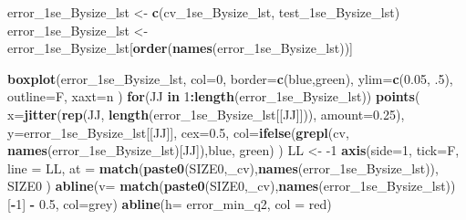 \documentclass[
]{book}
\newenvironment{Shaded}{\begin{snugshade}}{\end{snugshade}}
\newcommand{\ControlFlowTok}[1]{\textcolor[rgb]{0.13,0.29,0.53}{\textbf{#1}}}
\newcommand{\DataTypeTok}[1]{\textcolor[rgb]{0.13,0.29,0.53}{#1}}
\newcommand{\DecValTok}[1]{\textcolor[rgb]{0.00,0.00,0.81}{#1}}
\newcommand{\FloatTok}[1]{\textcolor[rgb]{0.00,0.00,0.81}{#1}}
\newcommand{\KeywordTok}[1]{\textcolor[rgb]{0.13,0.29,0.53}{\textbf{#1}}}
\newcommand{\NormalTok}[1]{#1}
\newcommand{\OperatorTok}[1]{\textcolor[rgb]{0.81,0.36,0.00}{\textbf{#1}}}
\newcommand{\StringTok}[1]{\textcolor[rgb]{0.31,0.60,0.02}{#1}}
\begin{document}
\begin{Shaded}
\begin{Highlighting}[]
\NormalTok{error\_1se\_Bysize\_lst <{-}}\StringTok{ }\KeywordTok{c}\NormalTok{(cv\_1se\_Bysize\_lst, test\_1se\_Bysize\_lst)}
\NormalTok{error\_1se\_Bysize\_lst <{-}}\StringTok{ }\NormalTok{error\_1se\_Bysize\_lst[}\KeywordTok{order}\NormalTok{(}\KeywordTok{names}\NormalTok{(error\_1se\_Bysize\_lst))]}

\KeywordTok{boxplot}\NormalTok{(error\_1se\_Bysize\_lst,}
  \DataTypeTok{col=}\DecValTok{0}\NormalTok{,}
  \DataTypeTok{border=}\KeywordTok{c}\NormalTok{(}\StringTok{\textquotesingle{}blue\textquotesingle{}}\NormalTok{,}\StringTok{\textquotesingle{}green\textquotesingle{}}\NormalTok{),}
  \DataTypeTok{ylim=}\KeywordTok{c}\NormalTok{(}\FloatTok{0.05}\NormalTok{, }\FloatTok{.5}\NormalTok{),}
  \DataTypeTok{outline=}\NormalTok{F,}
  \DataTypeTok{xaxt=}\StringTok{\textquotesingle{}n\textquotesingle{}}
\NormalTok{)}
\ControlFlowTok{for}\NormalTok{(JJ }\ControlFlowTok{in} \DecValTok{1}\OperatorTok{:}\KeywordTok{length}\NormalTok{(error\_1se\_Bysize\_lst))}
\KeywordTok{points}\NormalTok{(}
   \DataTypeTok{x=}\KeywordTok{jitter}\NormalTok{(}\KeywordTok{rep}\NormalTok{(JJ, }\KeywordTok{length}\NormalTok{(error\_1se\_Bysize\_lst[[JJ]])), }\DataTypeTok{amount=}\FloatTok{0.25}\NormalTok{), }
   \DataTypeTok{y=}\NormalTok{error\_1se\_Bysize\_lst[[JJ]], }\DataTypeTok{cex=}\FloatTok{0.5}\NormalTok{,}
   \DataTypeTok{col=}\KeywordTok{ifelse}\NormalTok{(}\KeywordTok{grepl}\NormalTok{(}\StringTok{\textquotesingle{}cv\textquotesingle{}}\NormalTok{, }\KeywordTok{names}\NormalTok{(error\_1se\_Bysize\_lst)[JJ]),}\StringTok{\textquotesingle{}blue\textquotesingle{}}\NormalTok{, }\StringTok{\textquotesingle{}green\textquotesingle{}}\NormalTok{)}
\NormalTok{)}
\NormalTok{LL <{-}}\StringTok{ }\DecValTok{{-}1}
\KeywordTok{axis}\NormalTok{(}\DataTypeTok{side=}\DecValTok{1}\NormalTok{, }\DataTypeTok{tick=}\NormalTok{F, }\DataTypeTok{line =}\NormalTok{ LL,}
  \DataTypeTok{at =} \KeywordTok{match}\NormalTok{(}\KeywordTok{paste0}\NormalTok{(SIZE0,}\StringTok{\textquotesingle{}\_cv\textquotesingle{}}\NormalTok{),}\KeywordTok{names}\NormalTok{(error\_1se\_Bysize\_lst)),}
\NormalTok{  SIZE0}
\NormalTok{ )}
\KeywordTok{abline}\NormalTok{(}\DataTypeTok{v=} \KeywordTok{match}\NormalTok{(}\KeywordTok{paste0}\NormalTok{(SIZE0,}\StringTok{\textquotesingle{}\_cv\textquotesingle{}}\NormalTok{),}\KeywordTok{names}\NormalTok{(error\_1se\_Bysize\_lst))[}\OperatorTok{{-}}\DecValTok{1}\NormalTok{] }\OperatorTok{{-}}\StringTok{ }\FloatTok{0.5}\NormalTok{, }\DataTypeTok{col=}\StringTok{\textquotesingle{}grey\textquotesingle{}}\NormalTok{)}
\KeywordTok{abline}\NormalTok{(}\DataTypeTok{h=}\NormalTok{ error\_min\_q2, }\DataTypeTok{col =} \StringTok{\textquotesingle{}red\textquotesingle{}}\NormalTok{)}

\end{Highlighting}
\end{Shaded}
\end{document}
